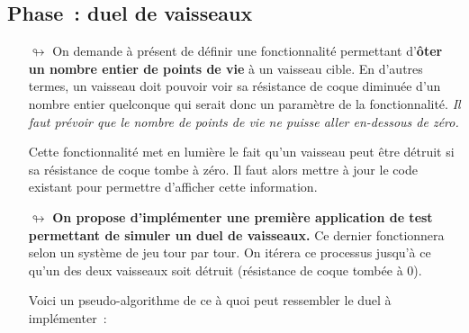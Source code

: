 \documentclass[10pt, fleqn, a4paper]{article}
\newenvironment{algorithme}
{
\begingroup

\footnotesize

\hrulefill

}
{

\hrulefill

\endgroup
}
\newcommand{\bfcolor}[2]{\textcolor{#1}{\textbf{#2}}}
\newcounter{quest}
\begin{document}
\addtocounter{quest}{1}
\subsection*{Phase~\thequest : \og{}duel de vaisseaux\fg{}}
\label{phase_duel}

\begin{itemize}
\item[$\looparrowright$] On demande à présent de définir une fonctionnalité permettant d'\textbf{ôter un nombre entier de points de vie} à un vaisseau cible. En d'autres termes, un vaisseau doit pouvoir voir sa résistance de coque diminuée d'un nombre entier quelconque qui serait donc un paramètre de la fonctionnalité. \textit{Il faut prévoir que le nombre de points de vie ne puisse aller en-dessous de zéro.}

Cette fonctionnalité met en lumière le fait qu'un vaisseau peut être détruit si sa résistance de coque tombe à zéro. Il faut alors mettre à jour le code existant pour permettre d'afficher cette information.

\item[$\looparrowright$] \bfcolor{greenTP}{On propose d'implémenter une première application de test permettant de simuler un \og{}duel de vaisseaux\fg{}.} Ce dernier fonctionnera selon un système de jeu \og{}tour par tour\fg{}. On itérera ce processus jusqu’à ce qu’un des deux vaisseaux soit détruit (résistance de coque tombée à 0).

Voici un pseudo-algorithme de ce à quoi peut ressembler le duel à implémenter~:

\begin{algorithme}


\end{algorithme}
\end{itemize}
\end{document}
